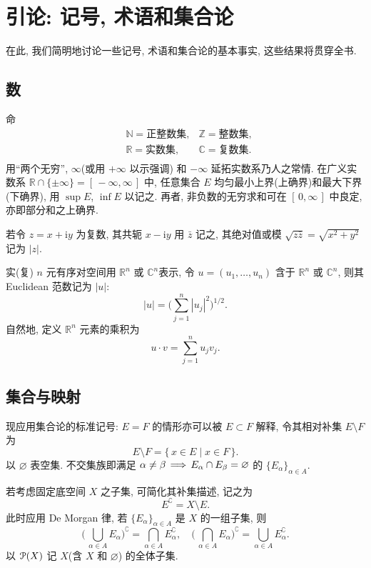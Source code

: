 \documentclass[twoside, fontset=fandol, punct=kaiming]{ctexbook}
\renewcommand\implies{\DOTSB \,\Longrightarrow \,}
\let \mathcal \EuScript
\theoremstyle{innocent}
\begin{document}
\chapter{引论: 记号, 术语和集合论}
在此, 我们简明地讨论一些记号, 术语和集合论的基本事实, 这些结果将贯穿全书.
\section{数}
命
\[
    \begin{aligned}
         & \mathbb N  =\textit{正整数集},
         & \mathbb Z  =\textit{整数集},   \\
         & \mathbb R  =\textit{实数集},
         & \mathbb C  =\textit{复数集}.   \\
    \end{aligned}
\]
用``两个无穷'', $\infty$(或用 $+\infty$ 以示强调) 和 $-\infty$ 延拓实数系乃人之常情. 在广义实数系 $\mathbb R\cap\{\pm\infty\}=[\,-\infty,\infty\,]$ 中, 任意集合 $E$ 均匀最小上界(上确界)和最大下界(下确界), 用 $\sup E$, $\inf E$ 以记之. 再者, 非负数的无穷求和可在 $[\,0,\infty\,]$ 中良定, 亦即部分和之上确界.

若令 $z=x+\mathrm iy$ 为复数, 其共轭 $x-\mathrm iy$ 用 $\bar z$ 记之, 其绝对值或模 $\sqrt{z\bar z} = \sqrt{x^2 + y^2}$ 记为 $|z|$.

实(复) $n$ 元有序对空间用 $\mathbb R^n$ 或 $\mathbb C^n$表示, 令 $u=(u_1,\dots,u_n)$ 含于 $\mathbb R^n$ 或 $\mathbb C^n$, 则其 Euclidean 范数记为 $|u|$:
\[
    |u| = \biggl( \sum_{j=1}^n |u_j|^2 \biggr) ^{1 /2}
    .\]
自然地, 定义 $\mathbb R^n$ 元素的乘积为
\[
    u\cdot v=\sum_{j=1}^n u_j v_j
    .\]
\section{集合与映射}
现应用集合论的标准记号: $E=F$ 的情形亦可以被 $E\subset F$ 解释, 令其相对补集 $E\setminus F$ 为
\[
    E\setminus F = \{\, x\in E \mid x\in F \,\}.
\]
以 $\varnothing$ 表空集. 不交集族即满足 $\alpha \neq \beta \implies E_\alpha\cap E_ \beta =\varnothing$ 的 $\{E_\alpha\}_{\alpha\in A}$.

若考虑固定底空间 $X$ 之子集, 可简化其补集描述, 记之为
\[
    E^\complement  = X\setminus E.
\]
此时应用 De Morgan 律, 若 $\{E_\alpha\}_{\alpha\in A}$ 是 $X$ 的一组子集, 则
\[
    \biggl(\, \bigcup_{\alpha\in A}E_\alpha \biggr)^\complement = \bigcap_{\alpha\in A}E_\alpha^\complement,\quad\biggl(\, \bigcap_{\alpha\in A}E_\alpha \biggr)^\complement = \bigcup_{\alpha\in A}E_\alpha^\complement.
\]
以 $\mathcal P(X)$ 记 $X$(含 $X$ 和 $\varnothing$) 的全体子集.
\end{document}
